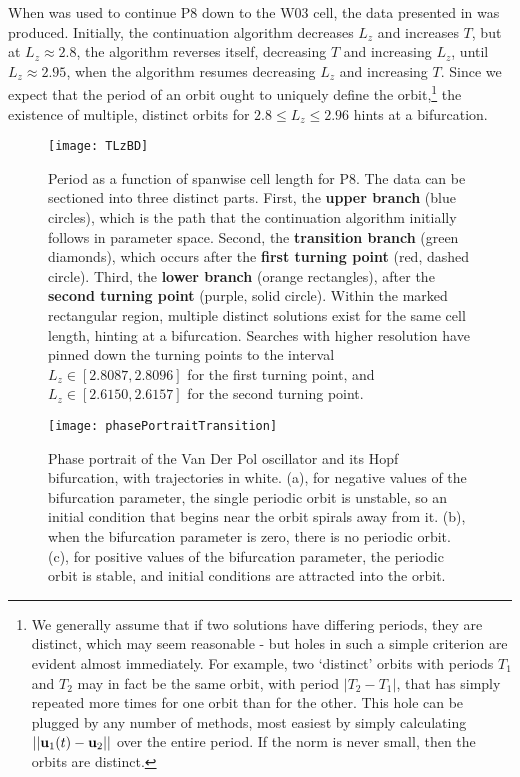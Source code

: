 When  was used to continue P8 down to the W03 cell, the data presented in  was produced.  Initially, the continuation algorithm decreases $L_z$ and increases $T$, but at $L_z \approx 2.8$, the algorithm reverses itself, decreasing $T$ and increasing $L_z$, until $L_z \approx 2.95$, when the algorithm resumes decreasing $L_z$ and increasing $T$. Since we expect that the period of an orbit ought to uniquely define the orbit,\footnote{We generally assume that if two solutions have differing periods, they are distinct, which may seem reasonable - but holes in such a simple criterion are evident almost immediately. For example, two `distinct' orbits with periods $T_1$ and $T_2$ may in fact be the same orbit, with period $|T_2-T_1|$, that has simply repeated more times for one orbit than for the other. This hole can be plugged by any number of methods, most easiest by simply calculating $||\mathbf{u}_1(t) - \mathbf{u}_2||$ over the entire period. If the norm is never small, then the orbits are distinct. }  the existence of multiple, distinct orbits for $2.8 \leq L_z \leq 2.96$ hints at a bifurcation. 
\begin{figure}[t]
\texttt{[image: TLzBD]}
\caption{Period as a function of spanwise cell length for P8. The data can be sectioned into three distinct parts. First, the {\bf upper branch} (blue circles), which is the path that the continuation algorithm initially follows in parameter space. Second, the {\bf transition branch} (green diamonds), which occurs after the {\bf first turning point} (red, dashed circle). Third, the {\bf lower branch} (orange rectangles), after the {\bf second turning point} (purple, solid circle). Within the marked rectangular region, multiple distinct solutions exist for the same cell length, hinting at a bifurcation. Searches with higher resolution have pinned down the turning points to the interval $L_z \in[2.8087, 2.8096]$ for the first turning point, and $L_z \in [2.6150,2.6157]$ for the second turning point.}\label{fig:LZBif}
\end{figure}
\begin{figure}[t]
\texttt{[image: phasePortraitTransition]}
\caption{Phase portrait of the Van Der Pol oscillator and its Hopf bifurcation, with trajectories in white. (a), for negative values of the bifurcation parameter, the single periodic orbit is unstable, so an initial condition that begins near the orbit spirals away from it. (b), when the bifurcation parameter is zero, there is no periodic orbit. (c), for positive values of the bifurcation parameter, the periodic orbit is stable, and initial conditions are attracted into the orbit.}\label{fig:phasePortrait}
\end{figure}
